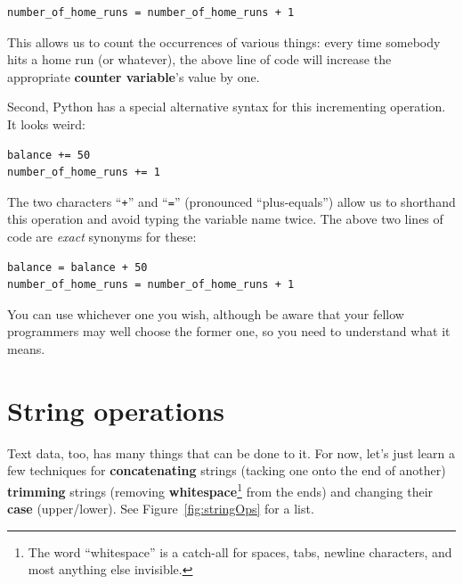 \vspace{-.15in}
\begin{Verbatim}[fontsize=\small,samepage=true,frame=single,framesep=3mm]
number_of_home_runs = number_of_home_runs + 1
\end{Verbatim}
\vspace{-.15in}

This allows us to count the occurrences of various things: every time somebody
hits a home run (or whatever), the above line of code will increase the
appropriate \textbf{counter variable}'s value by one.

\smallskip

Second, Python has a special alternative syntax for this incrementing
operation. It looks weird:

\vspace{-.15in}
\begin{Verbatim}[fontsize=\small,samepage=true,frame=single,framesep=3mm]
balance += 50
number_of_home_runs += 1
\end{Verbatim}

The two characters ``\texttt{+}'' and ``\texttt{=}'' (pronounced
``plus-equals'') allow us to shorthand this operation and avoid typing the
variable name twice. The above two lines of code are \textit{exact} synonyms
for these:

\vspace{-.15in}
\begin{Verbatim}[fontsize=\small,samepage=true,frame=single,framesep=3mm]
balance = balance + 50
number_of_home_runs = number_of_home_runs + 1
\end{Verbatim}

You can use whichever one you wish, although be aware that your fellow
programmers may well choose the former one, so you need to understand what it
means.

\section{String operations}

\label{concatenatingStrings}
Text data, too, has many things that can be done to it. For now, let's just
learn a few techniques for \textbf{concatenating} strings (tacking one onto the
end of another) \textbf{trimming} strings (removing
\textbf{whitespace}\footnote{The word ``whitespace'' is a catch-all for spaces,
tabs, newline characters, and most anything else invisible.} from the ends) and
changing their \textbf{case} (upper/lower). See Figure~\ref{fig:stringOps} for
a list.

